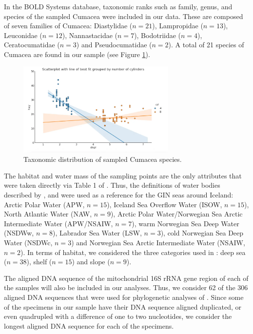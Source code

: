 In the BOLD Systems database, taxonomic ranks such as family, genus, and species of the sampled Cumacea were included in our data. These are composed of seven families of Cumacea: Diastylidae (\( n=21 \)), Lampropidae (\( n=13 \)), Leuconidae (\( n=12 \)), Nannastacidae (\( n=7 \)), Bodotriidae (\( n=4 \)), Ceratocumatidae (\( n=3 \)) and Pseudocumatidae (\( n=2 \)). A total of 21 species of Cumacea are found in our sample (see Figure \ref{fig:fig2}).

\begin{figure}[]
    \centering
    \includegraphics[width=0.7\textwidth]{figure7.webp}
    \caption{Taxonomic distribution of sampled Cumacea species. \label{fig:fig2}}
\end{figure}

The habitat and water mass of the sampling points are the only attributes that were taken directly via Table 1 of \cite{uhlir2021adding}. Thus, the definitions of water bodies described by \cite{hansen2000north}, \cite{brix2010distribution} and \cite{ostmann2014marine} were used as a reference for the GIN seas around Iceland: Arctic Polar Water (APW, \( n=15 \)), Iceland Sea Overflow Water (ISOW, \( n=15 \)), North Atlantic Water (NAW, \( n=9 \)), Arctic Polar Water/Norwegian Sea Arctic Intermediate Water (APW/NSAIW, \( n=7 \)), warm Norwegian Sea Deep Water (NSDWw, \( n=8 \)), Labrador Sea Water (LSW, \( n=3 \)), cold Norwegian Sea Deep Water (NSDWc, \( n=3 \)) and Norwegian Sea Arctic Intermediate Water (NSAIW, \( n=2 \)). In terms of habitat, we considered the three categories used in \cite{uhlir2021adding}: deep sea (\( n=38 \)), shelf (\( n=15 \)) and slope (\( n=9 \)).

The aligned DNA sequence of the mitochondrial 16S rRNA gene region of each of the samples will also be included in our analyses. Thus, we consider 62 of the 306 aligned DNA sequences that were used for phylogenetic analyses of \cite{uhlir2021adding}. Since some of the specimens in our sample have their DNA sequence aligned duplicated, or even quadrupled with a difference of one to two nucleotides, we consider the longest aligned DNA sequence for each of the specimens.

